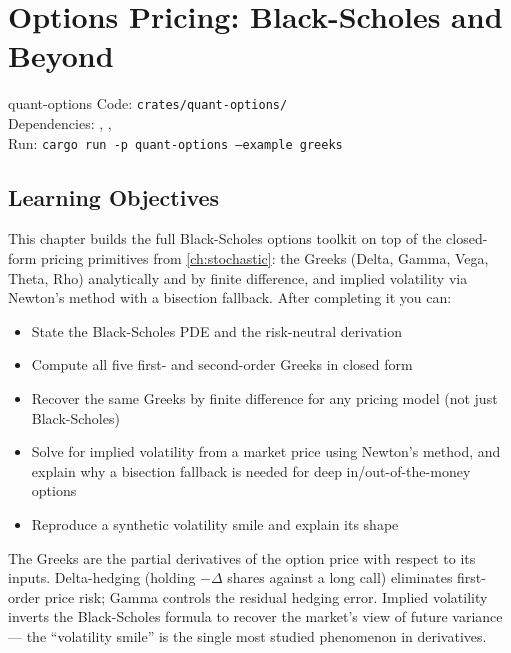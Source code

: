 \chapter{Options Pricing: Black-Scholes and Beyond}
\label{ch:options}

\begin{companioncode}{quant-options}
Code: \texttt{crates/quant-options/}\\
Dependencies: , , \\
Run: \texttt{cargo run -p quant-options --example greeks}
\end{companioncode}

\section{Learning Objectives}

This chapter builds the full Black-Scholes options toolkit on top of the
closed-form pricing primitives from \cref{ch:stochastic}: the Greeks
(Delta, Gamma, Vega, Theta, Rho) analytically and by finite difference,
and implied volatility via Newton's method with a bisection fallback.
After completing it you can:

\begin{itemize}
    \item State the Black-Scholes PDE and the risk-neutral derivation
    \item Compute all five first- and second-order Greeks in closed form
    \item Recover the same Greeks by finite difference for any pricing
      model (not just Black-Scholes)
    \item Solve for implied volatility from a market price using Newton's
      method, and explain why a bisection fallback is needed for deep
      in/out-of-the-money options
    \item Reproduce a synthetic volatility smile and explain its shape
\end{itemize}

\begin{keyinsight}
The Greeks are the partial derivatives of the option price with respect to
its inputs. Delta-hedging (holding $-\Delta$ shares against a long call)
eliminates first-order price risk; Gamma controls the residual hedging
error. Implied volatility inverts the Black-Scholes formula to recover
the market's view of future variance --- the ``volatility smile'' is the
single most studied phenomenon in derivatives.
\end{keyinsight}

